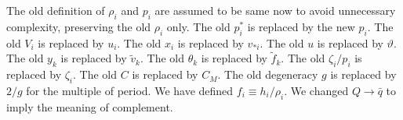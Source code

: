 \documentclass{article}
\begin{document}
The old definition of $\rho_i$ and $p_i$ are assumed to be same now
to avoid unnecessary complexity, preserving the old $\rho_i$ only.
The old $p^*_i$ is replaced by the new $p_i$.
The old $V_i$ is replaced by $u_i$.
The old $x_i$ is replaced by $v_{*i}$.
The old $u$ is replaced by $\vartheta$.
The old $y_k$ is replaced by $\tilde v_k$.
The old $\theta_k$ is replaced by $\tilde f_k$.
The old $\zeta_i/p_i$ is replaced by $\zeta_i$.
The old $C$ is replaced by $C_M$.
The old degeneracy $g$ is replaced by $2/g$ for the multiple of period.
%
We have defined $f_i \equiv h_i/\rho_i$.
We changed $Q \to \bar q$ to imply the meaning of complement.
\end{document}

